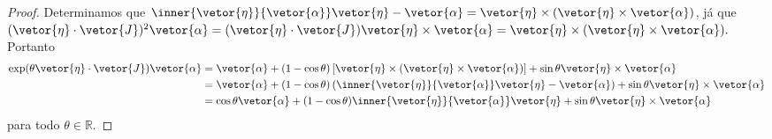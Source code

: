 \begin{proof}
    Determinamos que \(\inner{\vetor{\eta}}{\vetor{\alpha}}\vetor{\eta} - \vetor{\alpha} = \vetor{\eta}\times(\vetor{\eta} \times \vetor{\alpha})\), já que \((\vetor{\eta}\cdot\vetor{J})^2\vetor{\alpha} = (\vetor{\eta}\cdot\vetor{J})\vetor{\eta}\times\vetor{\alpha} = \vetor{\eta}\times(\vetor{\eta}\times \vetor{\alpha}).\) Portanto
    \begin{align*}
        \exp(\theta \vetor{\eta}\cdot \vetor{J}) \vetor{\alpha}
        &= \vetor{\alpha} + (1 - \cos\theta) \left[\vetor{\eta} \times (\vetor{\eta} \times \vetor{\alpha})\right] + \sin\theta \vetor{\eta}\times \vetor{\alpha}\\
        &= \vetor{\alpha} + (1 - \cos\theta) \left(\inner{\vetor{\eta}}{\vetor{\alpha}}\vetor{\eta} - \vetor{\alpha}\right) + \sin\theta \vetor{\eta}\times \vetor{\alpha} \\
                                                                &= \cos\theta\vetor{\alpha} + (1 - \cos\theta) \inner{\vetor{\eta}}{\vetor{\alpha}}\vetor{\eta} + \sin\theta \vetor{\eta}\times \vetor{\alpha}
    \end{align*}
    para todo \(\theta \in \mathbb{R}\).
\end{proof}
